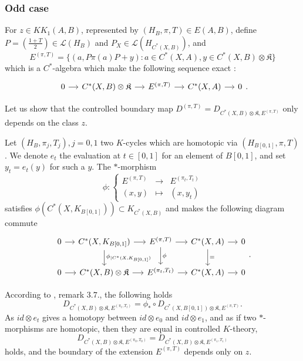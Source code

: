 \subsubsection{Odd case}

For $z\in KK_1(A,B)$, represented by $(H_B,\pi,T)\in E(A,B)$, define $P=(\frac{1+T}{2})\in \mathcal L(H_B)$ and $P_X\in\mathcal L(H_{C^*(X,B)})$, and  
\[E^{(\pi,T)} = \{(a,P\pi(a)P + y) : a\in C^*(X,A),y\in C^*(X,B)\otimes \mathfrak K\} \]
which is a $C^*$-algebra which make the following sequence exact :
\[\begin{tikzcd}[column sep = small]0\arrow{r} & C^*(X,B)\otimes \mathfrak K \arrow{r} & E^{(\pi,T)}\arrow{r} & C^*(X,A)\arrow{r} & 0 \end{tikzcd}.\]

Let us show that the controlled boundary map $D^{(\pi,T)}=D_{C^*(X,B)\otimes \mathfrak K,E^{(\pi,T)}}$ only depends on the class $z$.

Let $(H_B, \pi_j,T_j), j=0,1$ two $K$-cycles which are homotopic via $(H_{B[0,1]},\pi,T)$. We denote $e_t$ the evaluation at $t\in[0,1]$ for an element of $B[0,1]$, and set $y_t=e_t(y)$ for such a $y$. The $*$-morphism
\[\phi : \left\{\begin{array}{lll}E^{(\pi,T)} & \rightarrow & E^{(\pi_t,T_t)} \\ (x,y) & \mapsto & (x, y_t)\end{array}\right.\]
satisfies $\phi(C^*(X,K_{B[0,1]}))\subset K_{C^*(X,B)}$ and makes the following diagram commute
\[\begin{tikzcd}[column sep = small]
0\arrow{r} & C^*(X,K_{B[0,1]})\arrow{r}\arrow{d}{\phi_{|C^*(X,K_{B[0,1]})}} & E^{(\pi,T)} \arrow{r}\arrow{d}{\phi} & C^*(X,A)\arrow{r}\arrow{d}{=}& 0 \\
0\arrow{r} & C^*(X,B)\otimes\mathfrak K\arrow{r} &  E^{(\pi_t,T_t)} \arrow{r} & C^*(X,A) \arrow{r} & 0
\end{tikzcd}.\]

According to \cite{OY2}, remark $3.7.$, the following holds
\[D_{C^*(X,B)\otimes\mathfrak K,E^{(\pi_t,T_t)}} = \phi_* \circ D_{C^*(X,B[0,1])\otimes\mathfrak K,E^{(\pi,T)}}.\]
As $id \otimes e_t$ gives a homotopy between $id\otimes e_0$ and $id\otimes e_1$, and as if two $*$-morphisms are homotopic, then they are equal in controlled $K$-theory, 
\[D_{C^*(X,B)\otimes\mathfrak K, E^{(\pi_0,T_0)}}=D_{C^*(X,B)\otimes\mathfrak K, E^{(\pi_1,T_1)}}\]
holds, and the boundary of the extension $E^{(\pi,T)}$ depends only on $z$.\\

